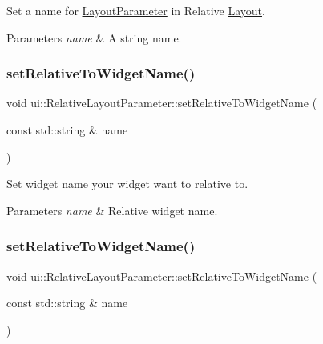 Set a name for \hyperlink{classui_1_1LayoutParameter}{Layout\+Parameter} in Relative \hyperlink{classui_1_1Layout}{Layout}.


\begin{DoxyParams}{Parameters}
{\em name} & A string name. \\
\hline
\end{DoxyParams}
\mbox{\label{classui_1_1RelativeLayoutParameter_aa1ba720efd1054c7dfedca47dfb26975}} 
\subsubsection{\texorpdfstring{set\+Relative\+To\+Widget\+Name()}{setRelativeToWidgetName()}\hspace{0.1cm}{\footnotesize\ttfamily [1/2]}}
{\footnotesize\ttfamily void ui\+::\+Relative\+Layout\+Parameter\+::set\+Relative\+To\+Widget\+Name (\begin{DoxyParamCaption}\item[{const std\+::string \&}]{name }\end{DoxyParamCaption})}

Set widget name your widget want to relative to.


\begin{DoxyParams}{Parameters}
{\em name} & Relative widget name. \\
\hline
\end{DoxyParams}
\mbox{\label{classui_1_1RelativeLayoutParameter_aa1ba720efd1054c7dfedca47dfb26975}} 
\subsubsection{\texorpdfstring{set\+Relative\+To\+Widget\+Name()}{setRelativeToWidgetName()}\hspace{0.1cm}{\footnotesize\ttfamily [2/2]}}
{\footnotesize\ttfamily void ui\+::\+Relative\+Layout\+Parameter\+::set\+Relative\+To\+Widget\+Name (\begin{DoxyParamCaption}\item[{const std\+::string \&}]{name }\end{DoxyParamCaption})}

